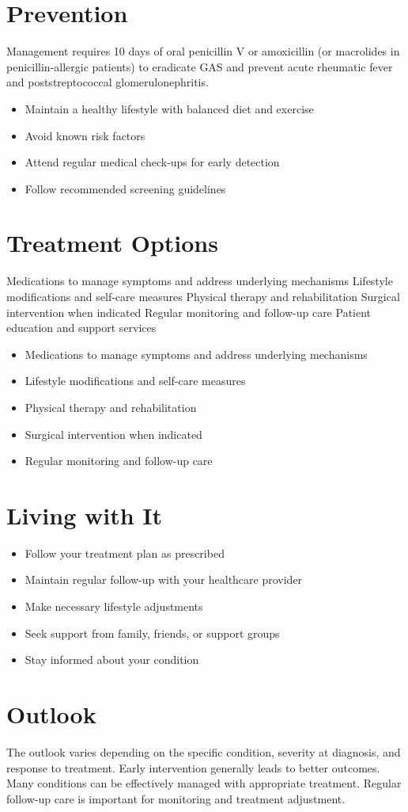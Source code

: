 \section{Prevention}
Management requires 10 days of oral penicillin V or amoxicillin (or macrolides in penicillin-allergic patients) to eradicate GAS and prevent acute rheumatic fever and poststreptococcal glomerulonephritis.

\begin{itemize}[noitemsep]
  \item Maintain a healthy lifestyle with balanced diet and exercise
  \item Avoid known risk factors
  \item Attend regular medical check-ups for early detection
  \item Follow recommended screening guidelines
\end{itemize}
\section{Treatment Options}
Medications to manage symptoms and address underlying mechanisms Lifestyle modifications and self-care measures Physical therapy and rehabilitation Surgical intervention when indicated Regular monitoring and follow-up care Patient education and support services

\begin{itemize}[noitemsep]
  \item Medications to manage symptoms and address underlying mechanisms
  \item Lifestyle modifications and self-care measures
  \item Physical therapy and rehabilitation
  \item Surgical intervention when indicated
  \item Regular monitoring and follow-up care
\end{itemize}
\section{Living with It}
\begin{itemize}[noitemsep]
  \item Follow your treatment plan as prescribed
  \item Maintain regular follow-up with your healthcare provider
  \item Make necessary lifestyle adjustments
  \item Seek support from family, friends, or support groups
  \item Stay informed about your condition
\end{itemize}
\section{Outlook}
The outlook varies depending on the specific condition, severity at diagnosis, and response to treatment. Early intervention generally leads to better outcomes. Many conditions can be effectively managed with appropriate treatment. Regular follow-up care is important for monitoring and treatment adjustment.

